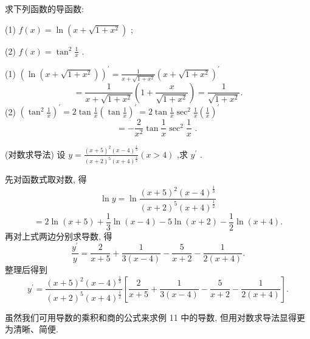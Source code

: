 \begin{example}
求下列函数的导函数:

(1) \(f\left( x\right)  = \ln \left( {x + \sqrt{1 + {x}^{2}}}\right)\) ;

(2) \(f\left( x\right)  = {\tan }^{2}\frac{1}{x}\) .
\end{example}


\begin{solution}
(1) \({\left( \ln \left( x + \sqrt{1 + {x}^{2}}\right) \right) }^{\prime } = \frac{1}{x + \sqrt{1 + {x}^{2}}}{\left( x + \sqrt{1 + {x}^{2}}\right) }^{\prime }\)
\[
= \frac{1}{x + \sqrt{1 + {x}^{2}}}\left( {1 + \frac{x}{\sqrt{1 + {x}^{2}}}}\right)  = \frac{1}{\sqrt{1 + {x}^{2}}}.
\]
(2) \({\left( {\tan }^{2}\frac{1}{x}\right) }^{\prime } = 2\tan \frac{1}{x}{\left( \tan \frac{1}{x}\right) }^{\prime } = 2\tan \frac{1}{x}{\sec }^{2}\frac{1}{x}{\left( \frac{1}{x}\right) }^{\prime }\)
\[
=  - \frac{2}{{x}^{2}}\tan \frac{1}{x}{\sec }^{2}\frac{1}{x}\text{ . }
\]
\end{solution}

\begin{example}
(对数求导法) 设 \(y = \frac{{\left( x + 5\right) }^{2}{\left( x - 4\right) }^{\frac{1}{3}}}{{\left( x + 2\right) }^{5}{\left( x + 4\right) }^{\frac{1}{2}}}\left( {x > 4}\right)\) ,求 \({y}^{\prime }\) .
\end{example}


\begin{solution}
先对函数式取对数, 得
\[
\ln y = \ln \frac{{\left( x + 5\right) }^{2}{\left( x - 4\right) }^{\frac{1}{3}}}{{\left( x + 2\right) }^{5}{\left( x + 4\right) }^{\frac{1}{2}}}
\]
\[
= 2\ln \left( {x + 5}\right)  + \frac{1}{3}\ln \left( {x - 4}\right)  - 5\ln \left( {x + 2}\right)  - \frac{1}{2}\ln \left( {x + 4}\right) .
\]
再对上式两边分别求导数, 得
\[
\frac{{y}^{\prime }}{y} = \frac{2}{x + 5} + \frac{1}{3\left( {x - 4}\right) } - \frac{5}{x + 2} - \frac{1}{2\left( {x + 4}\right) }.
\]
整理后得到
\[
{y}^{\prime } = \frac{{\left( x + 5\right) }^{2}{\left( x - 4\right) }^{\frac{1}{3}}}{{\left( x + 2\right) }^{5}{\left( x + 4\right) }^{\frac{1}{2}}}\left\lbrack  {\frac{2}{x + 5} + \frac{1}{3\left( {x - 4}\right) } - \frac{5}{x + 2} - \frac{1}{2\left( {x + 4}\right) }}\right\rbrack  .
\]
\end{solution}

\begin{remark}
虽然我们可用导数的乘积和商的公式来求例 11 中的导数, 但用对数求导法显得更为清晰、简便.
\end{remark}


